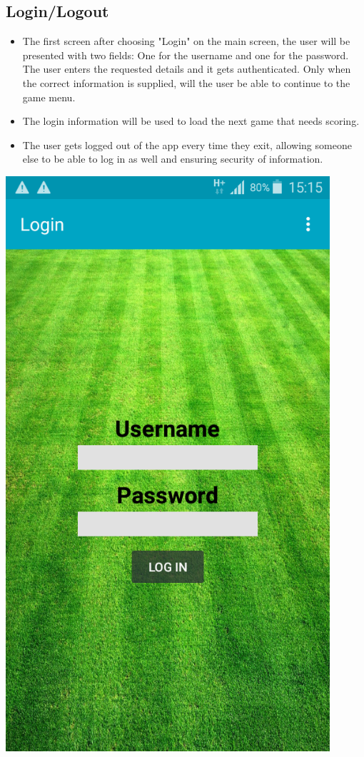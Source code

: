 \documentclass[hidelinks,a4paper,12pt]{article}
\begin{document}
	\subsection{Login/Logout}
		\begin {itemize}
			\item The first screen after choosing "Login" on the main screen, the user will be presented with two fields: One for the username and one for the password. The user enters the requested details and it gets authenticated. Only when the correct information is supplied, will the user be able to continue to the game menu.
			\item The login information will be used to load the next game that needs scoring.
			\item The user gets logged out of the app every time they exit, allowing someone else to be able to log in as well and ensuring security of information.
		\end{itemize}
		
  		\begin{minipage}[b]{0.4\textwidth}
    			\includegraphics[width=0.9\textwidth]{./images/login_menu.png}
  		\end{minipage}
\end{document}

